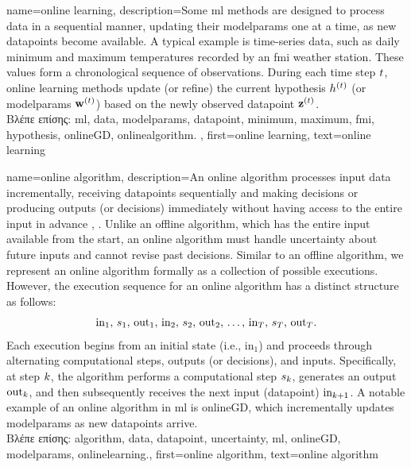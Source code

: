 {name={online learning},
	description={Some \gls{ml} methods  are designed to process \gls{data} in a sequential 
		manner, updating their \gls{modelparams} one at a time, as new \gls{datapoint}s become available. 
		A typical example is time-series \gls{data}, such as daily \gls{minimum} and \gls{maximum} temperatures 
		recorded by an \gls{fmi} weather station. These values form a chronological sequence 
		of observations. During each time step $t$, online learning methods update (or refine)  
		the current \gls{hypothesis} $h^{(t)}$ (or \gls{modelparams} ${\bf w}^{(t)}$) 
		based on the newly observed \gls{datapoint} ${\bf z}^{(t)}$.  \\ 
		\foreignlanguage{greek}{Βλέπε επίσης:} \gls{ml}, \gls{data}, \gls{modelparams}, \gls{datapoint}, 
		\gls{minimum}, \gls{maximum}, \gls{fmi}, \gls{hypothesis}, \gls{onlineGD}, \gls{onlinealgorithm}.  },
	first={online learning},
	text={online learning} 
}

{name={online algorithm},
	description={An online \gls{algorithm} processes input \gls{data} incrementally, 
		receiving \gls{datapoint}s sequentially and making decisions or producing outputs (or decisions) immediately 
		without having access to the entire input in advance \cite{PredictionLearningGames}, \cite{HazanOCO}. 
		Unlike an offline \gls{algorithm}, which has the entire input available from the start, an online \gls{algorithm} 
		must handle \gls{uncertainty} about future inputs and cannot revise past decisions. Similar to an 
		offline \gls{algorithm}, we represent an online \gls{algorithm} formally as a collection of possible 
		executions. However, the execution sequence for an online \gls{algorithm} has a distinct structure as follows:
		$${\rm in}_{1}, \,s_1, \,{\rm out}_{1}, \,{\rm in}_{2}, \,s_2, \,{\rm out}_{2}, \,\ldots, \,{\rm in}_{T}, \,s_T, \,{\rm out}_{T}.$$ 
		Each execution begins from an initial state (i.e., \(\text{in}_{1}\)) and proceeds through alternating 
		computational steps, outputs (or decisions), and inputs. Specifically, at step \(k\), 
		the \gls{algorithm} performs a computational step \(s_{k}\), generates an output \(\text{out}_{k}\), 
		and then subsequently receives the next input (\gls{datapoint}) \(\text{in}_{k+1}\). A 
		notable example of an online \gls{algorithm} in \gls{ml} is \gls{onlineGD}, which incrementally 
		updates \gls{modelparams} as new \gls{datapoint}s arrive. 
					\\ 
		\foreignlanguage{greek}{Βλέπε επίσης:} \gls{algorithm}, \gls{data}, \gls{datapoint}, \gls{uncertainty}, \gls{ml}, 
		\gls{onlineGD}, \gls{modelparams}, \gls{onlinelearning}.},
	first={online algorithm},
	text={online algorithm} 
}


